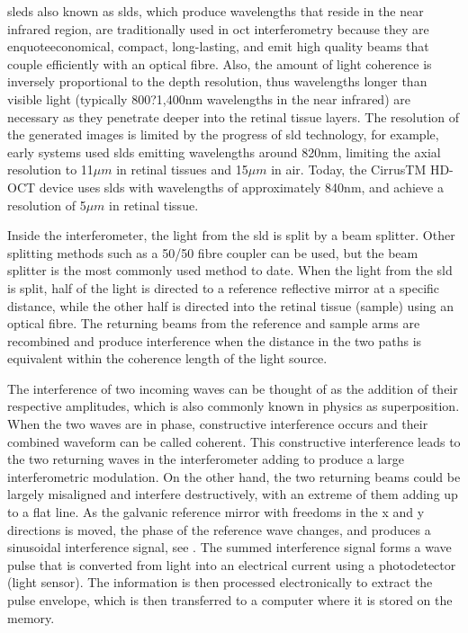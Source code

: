 \Gls{sled}s also known as \Gls{sld}s, which produce wavelengths that reside in the near infrared region,
are traditionally used in \Gls{oct} interferometry because they are enquote{economical,
compact, long-lasting, and emit high quality beams that couple efficiently
with an optical fibre}.\cite{mbib_6} Also, the amount of light coherence
is inversely proportional to the depth resolution, thus wavelengths longer
than visible light (typically 800?1,400nm wavelengths in the near infrared) 
are necessary as they penetrate deeper into the retinal tissue layers.\cite{mbib_4,mbib_7}
The resolution of the generated images is limited by the progress of \Gls{sld}
technology, for example, early systems used \Gls{sld}s emitting wavelengths around
820nm, limiting the axial resolution to 11$\mu m$ in retinal tissues and 15$\mu m$
in air. \cite{mbib_6}  Today, the CirrusTM HD-OCT device uses \Gls{sld}s with wavelengths
of approximately 840nm, and achieve a resolution of 5$\mu m$ in retinal tissue.\cite{mbib_7}

Inside the interferometer, the light from the \Gls{sld} is split by a beam splitter.
Other splitting methods such as a 50/50 fibre coupler can be used, but the beam
splitter is the most commonly used method to date.  When the light from the \Gls{sld}
is split, half of the light is directed to a reference reflective mirror at a
specific distance, while the other half is directed into the retinal tissue (sample)
using an optical fibre.  The returning beams from the reference and sample arms
are recombined and produce interference when the distance in the two paths is
equivalent within the coherence length of the light source. \cite{mbib_5,mbib_6}

The interference of two incoming waves can be thought of as the addition of their
respective amplitudes, which is also commonly known in physics as superposition.
When the two waves are in phase, constructive interference occurs and their combined
waveform can be called coherent.  This constructive interference leads to the two
returning waves in the interferometer adding to produce a large interferometric
modulation.  On the other hand, the two returning beams could be largely misaligned
and interfere destructively, with an extreme of them adding up to a flat line.
As the galvanic reference mirror with freedoms in the x and y directions is moved,
the phase of the reference wave changes, and produces a sinusoidal interference
signal, see . The summed interference signal forms a wave pulse 
that is converted
from light into an electrical current using a photodetector (light sensor).\cite{mbib_6}
The information is then processed electronically to extract the pulse envelope, which
is then transferred to a computer where it is stored on the memory.\cite{mbib_6}


